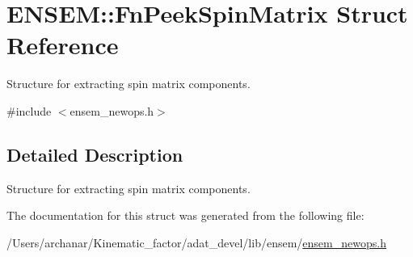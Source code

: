 \hypertarget{structENSEM_1_1FnPeekSpinMatrix}{}\section{E\+N\+S\+EM\+:\+:Fn\+Peek\+Spin\+Matrix Struct Reference}
\label{structENSEM_1_1FnPeekSpinMatrix}


Structure for extracting spin matrix components.  




{\ttfamily \#include $<$ensem\+\_\+newops.\+h$>$}



\subsection{Detailed Description}
Structure for extracting spin matrix components. 

The documentation for this struct was generated from the following file\+:\begin{DoxyCompactItemize}
\item 
/\+Users/archanar/\+Kinematic\+\_\+factor/adat\+\_\+devel/lib/ensem/\mbox{\hyperlink{lib_2ensem_2ensem__newops_8h}{ensem\+\_\+newops.\+h}}\end{DoxyCompactItemize}
